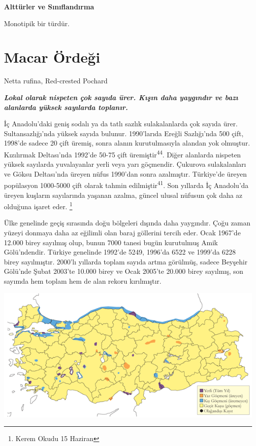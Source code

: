 \documentclass[
  letterpaper,
  DIV=11,
  numbers=noendperiod]{scrreprt}
\begin{document}
\textbf{Alttürler ve Sınıflandırma}

Monotipik bir türdür.

\section{Macar Ördeği}\label{macar-uxf6rdeux11fi}

Netta rufina, Red-crested Pochard

\textbf{\emph{Lokal olarak nispeten çok sayıda ürer. Kışın daha
yaygındır ve bazı alanlarda yüksek sayılarda toplanır.}}

İç Anadolu'daki geniş sodalı ya da tatlı sazlık sulakalanlarda çok
sayıda ürer. Sultansazlığı'nda yüksek sayıda bulunur. 1990'larıda Ereğli
Sazlığı'nda 500 çift, 1998'de sadece 20 çift üremiş, sonra alanın
kurutulmasıyla alandan yok olmuştur. Kızılırmak Deltası'nda 1992'de
50-75 çift üremiştir\textsuperscript{44}. Diğer alanlarda nispeten
yüksek sayılarda yuvalayanlar yerli veya yarı göçmendir. Çukurova
sulakalanları ve Göksu Deltası'nda üreyen nüfus 1990'dan sonra
azalmıştır. Türkiye'de üreyen popülasyon 1000-5000 çift olarak tahmin
edilmiştir\textsuperscript{41}. Son yıllarda İç Anadolu'da üreyen
kuşların sayılarında yaşanan azalma, güncel ulusal nüfusun çok daha az
olduğuna işaret eder. \footnote{Kerem Okudu 15 Haziran}

Ülke genelinde geçiş sırasında doğu bölgeleri dışında daha yaygındır.
Çoğu zaman yüzeyi donmaya daha az eğilimli olan baraj göllerini tercih
eder. Ocak 1967'de 12.000 birey sayılmış olup, bunun 7000 tanesi bugün
kurutulmuş Amik Gölü'ndendir. Türkiye genelinde 1992'de 5249, 1996'da
6522 ve 1999'da 6228 birey sayılmıştır. 2000'lı yıllarda toplam sayıda
artma görülmüş, sadece Beyşehir Gölü'nde Şubat 2003'te 10.000 birey ve
Ocak 2005'te 20.000 birey sayılmış, son sayımda hem toplam hem de alan
rekoru kırılmıştır.

\includegraphics{images/harita_Page_022.png}
\end{document}
